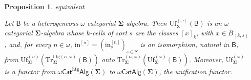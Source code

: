 \documentclass[a4paper, reqno]{amsbook}
\makeatletter
\newcommand{\sig}[1]{\mathbf{#1}}             %
\newcommand{\calg}[1]{\boldsymbol{\mathsf{#1}}} %
\newcommand{\htg}{\mathrm{htg}}                %
\newcommand{\Uf}{\mathrm{Uf}}
\newcommand{\Tr}{\mathrm{Tr}}
\theoremstyle{plain}
\newtheorem{proposition}[theorem]{Proposition}
\theoremstyle{definition}
\newcommand*{\CA@leanpending}{}
\newcommand*{\CA@leanrelation}{}
\newcommand*{\lean}[2]{%
  \ifcsname\string\color@lean@#1\endcsname\else
    \PackageError{main}{Unknown relation `#1' in \string\lean}{Use equivalent, weaker or stronger.}%
  \fi
  \gdef\CA@leanrelation{#1}%
  \gdef\CA@leanpending{#2}}
\makeatother
\begin{document}
\begin{proposition}\label{PUfFunctorOmega}\lean{equivalent}{Omega.unified_isModel,Omega.unified_isCell_iff,Omega.unificationFunctor}
Let $\calg{B}$ be a heterogeneous $\omega$-categorial $\sig{\Sigma}$-algebra.
Then $\Uf^{(\omega)}_{\sig{\Sigma}}(\calg{B})$ is an $\omega$-categorial $\sig{\Sigma}$-algebra whose $k$-cells of sort $s$ are the classes $[x]_{k}$, with $x\in B_{(k,s)}$, and, for every $n\in\omega$, $\mathrm{in}^{[n]}=(\mathrm{in}^{[n]}_{s})_{s\in S}$ is an isomorphism, natural in $\calg{B}$, from $\Uf^{(n)}_{\sig{\Sigma}}(\Tr^{\htg(n,\omega)}_{\sig{\Sigma}}(\calg{B}))$ onto $\Tr^{(n,\omega)}_{\sig{\Sigma}}(\Uf^{(\omega)}_{\sig{\Sigma}}(\calg{B}))$.
Moreover, $\Uf^{(\omega)}_{\sig{\Sigma}}$ is a functor from $\omega\mathsf{Cat}^{\htg}\mathsf{Alg}(\sig{\Sigma})$ to $\omega\mathsf{CatAlg}(\sig{\Sigma})$, the \emph{unification functor}.
\end{proposition}
\end{document}
